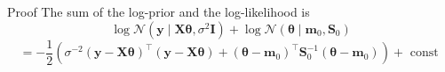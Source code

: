 \documentclass{beamer}
\begin{document}
\begin{frame}{Proof}
The sum of the log-prior and the log-likelihood is
\begin{equation*}
 \log \mathcal{N}\left(\boldsymbol{y} \mid \boldsymbol{X} \boldsymbol{\theta}, \sigma^2 \boldsymbol{I}\right)+\log \mathcal{N}\left(\boldsymbol{\theta} \mid \boldsymbol{m}_0, \boldsymbol{S}_0\right) 
\end{equation*}
\begin{equation*}
=-\frac{1}{2}\left(\sigma^{-2}(\boldsymbol{y}-\boldsymbol{X} \boldsymbol{\theta})^{\top}(\boldsymbol{y}-\boldsymbol{X} \boldsymbol{\theta})+\left(\boldsymbol{\theta}-\boldsymbol{m}_0\right)^{\top} \boldsymbol{S}_0^{-1}\left(\boldsymbol{\theta}-\boldsymbol{m}_0\right)\right)+\text { const }
\end{equation*}
    
\end{frame}
\end{document}
